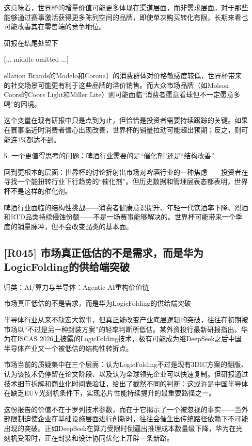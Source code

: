 \documentclass[11pt]{ctexart}
\begin{document}
这意味着，世界杯的增量价值可能更多体现在渠道层面，而非需求层面。对于那些能够通过赛事激活获得更多陈列空间的品牌，即使单次购买转化有限，长期来看也可能改善其在零售端的竞争地位。

研报在结尾处留下

[... middle omitted ...]

ellation Brands的Modelo和Corona）的消费群体对价格敏感度较低，世界杯带来的社交场景可能更有利于这些品牌的溢价销售。而大众市场品牌（如Molson Coors的Coors Light和Miller Lite）则可能面临“消费者愿意看球但不一定愿意多喝”的困境。

这个变量在现有研报中只是点到为止，但恰恰是投资者需要持续跟踪的关键。如果在赛事临近时消费者信心出现改善，世界杯的销量拉动可能超出预期；反之，则可能连1\%都达不到。

5. 一个更值得思考的问题：啤酒行业需要的是“催化剂”还是“结构改善”

回到更根本的层面：世界杯的讨论折射出市场对啤酒行业的一种焦虑——投资者在寻找一个能扭转行业下行趋势的“催化剂”。但历史数据和管理层表态都表明，世界杯不是这样的催化剂。

啤酒行业面临的结构性挑战——消费者健康意识提升、年轻一代饮酒率下降、烈酒和RTD品类持续侵蚀份额——不是一场赛事能够解决的。世界杯可能带来一个季度的销量脉冲，但不会改变品类的基本面。

\subsection{[R045] 市场真正低估的不是需求，而是华为LogicFolding的供给端突破}
{\small\color{refgray}归类：AI/算力与半导体：Agentic AI重构价值链}

市场真正低估的不是需求，而是华为LogicFolding的供给端突破

半导体行业从来不缺宏大叙事，但真正能改变产业底层逻辑的突破，往往在初期被市场以“不过是另一种封装方案”的轻率判断所低估。某外资投行最新研报指出，华为在ISCAS 2026上披露的LogicFolding技术，极有可能成为继DeepSeek之后中国半导体产业又一个被低估的结构性转折点。

市场当前的质疑集中在三个层面：认为LogicFolding不过是现有3DIC方案的翻版、认为该技术仍停留在论文阶段、以及认为全球领先企业可以快速复制。但研报通过技术细节拆解和商业化时间表验证，给出了截然不同的判断：这或许是中国半导体在缺乏EUV光刻机条件下，实现芯片性能持续提升的最重要路径之一。

这份报告的价值不在于罗列技术参数，而在于它揭示了一个被忽视的事实——当外部限制迫使企业在基础设施层面进行创新时，往往会催生出传统路径依赖下不可能出现的突破。正如DeepSeek在算力受限时倒逼出推理成本数量级下降，华为在光刻机受限时，正在封装和设计协同优化上开辟一条新路。
\end{document}
